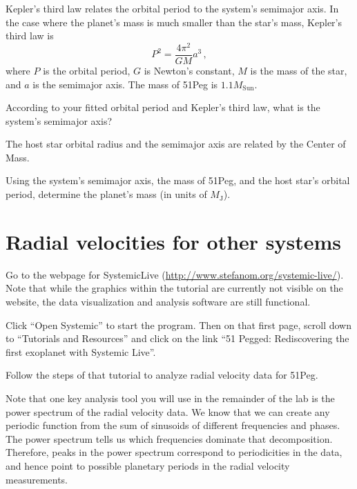Kepler's third law relates the orbital period to the system's semimajor axis. In the case where the planet’s mass is much smaller than the star’s mass, Kepler's third law is
\begin{equation}
 P^2=\frac{4 \pi^2}{GM} a^3 \,,
\end{equation}
where $P$ is the orbital period, $G$ is Newton's constant, $M$ is the mass of the star, and $a$ is the semimajor axis. The mass of 51Peg is $1.1 M_\textrm{Sun}$.

\begin{steps}
	\item According to your fitted orbital period and Kepler's third law, what is the system's semimajor axis?
\end{steps}

The host star orbital radius and the semimajor axis are related by the Center of Mass.


\begin{steps}
	\item Using the system's semimajor axis, the mass of 51Peg, and the host star’s orbital period, determine the planet’s mass (in units of $M_\textrm{J}$).
\end{steps}

\section{Radial velocities for other systems}

\begin{steps}
	\item Go to the webpage for SystemicLive (\url{http://www.stefanom.org/systemic-live/}). Note that while the graphics within the tutorial are currently not visible on the website, the data visualization and analysis software are still functional.
	
	\item Click ``Open Systemic'' to start the program. Then on that first page, scroll down to ``Tutorials and Resources'' and click on the link ``51 Pegged: Rediscovering the first exoplanet with Systemic Live''.
	
	\item Follow the steps of that tutorial to analyze radial velocity data for 51Peg.
\end{steps}

Note that one key analysis tool you will use in the remainder of the lab is the power spectrum of the radial velocity data. We know that we can create any periodic function from the sum of sinusoids of different frequencies and phases. The power spectrum tells us which frequencies dominate that decomposition. Therefore, peaks in the power spectrum correspond to periodicities in the data, and hence point to possible planetary periods in the radial velocity measurements.

